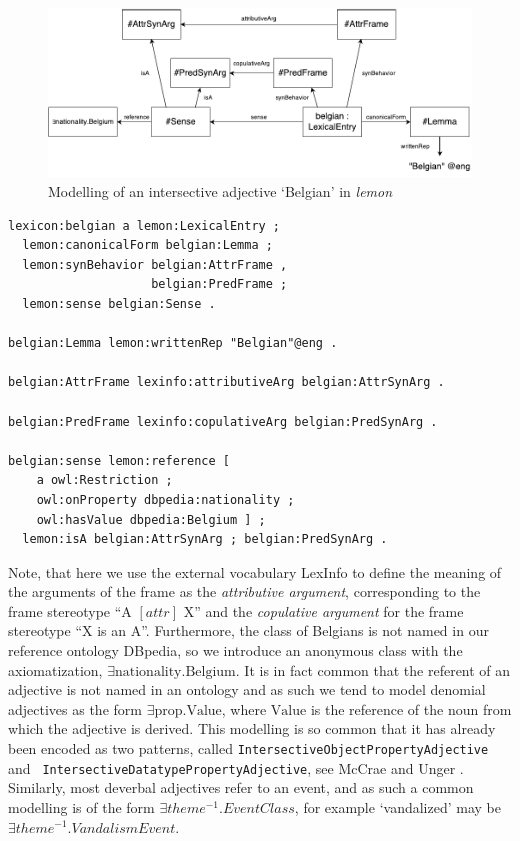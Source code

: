 \documentclass[11pt]{article}
\begin{document}
\begin{figure}
\includegraphics[width=\textwidth]{belgian-example}
\caption{Modelling of an intersective adjective `Belgian' in \emph{lemon}\label{example-belgian}}
\end{figure}

\begin{verbatim}
lexicon:belgian a lemon:LexicalEntry ;
  lemon:canonicalForm belgian:Lemma ;
  lemon:synBehavior belgian:AttrFrame , 
                    belgian:PredFrame ;
  lemon:sense belgian:Sense .

belgian:Lemma lemon:writtenRep "Belgian"@eng .

belgian:AttrFrame lexinfo:attributiveArg belgian:AttrSynArg .

belgian:PredFrame lexinfo:copulativeArg belgian:PredSynArg .

belgian:sense lemon:reference [
    a owl:Restriction ;
    owl:onProperty dbpedia:nationality ;
    owl:hasValue dbpedia:Belgium ] ;
  lemon:isA belgian:AttrSynArg ; belgian:PredSynArg .
\end{verbatim}

Note, that here we use the external vocabulary LexInfo \cite{cimiano2011lexinfo} 
to define the meaning of the arguments of the frame as the \emph{attributive 
argument}, corresponding to the frame stereotype ``A $[attr]$ X'' and the 
\emph{copulative argument} for the frame stereotype ``X is an A''. Furthermore,
the class of Belgians is not named in our reference ontology DBpedia, so we 
introduce an anonymous class with the axiomatization, 
$\exists \text{nationality}.\text{Belgium}$. It is in fact common that the 
referent of an adjective is not named in an ontology and as such we tend to 
model denomial adjectives as the form $\exists \text{prop}.\text{Value}$, 
where $\text{Value}$ is the reference of the noun from which the adjective is
derived. This modelling is so common that it has already been encoded as two
patterns, called {\tt IntersectiveObjectPropertyAdjective} and {\tt
IntersectiveDatatypePropertyAdjective}, see McCrae and Unger .
Similarly, most deverbal adjectives refer to an event, and as such
a common modelling is of the form $\exists theme^{-1}.EventClass$, for example 
`vandalized' may be $\exists theme^{-1}.VandalismEvent$.
\end{document}
